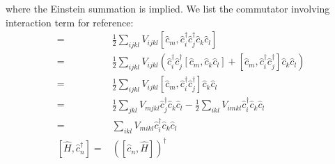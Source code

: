 \documentclass[11pt,letterpaper]{article}
\theoremstyle{definition}
\theoremstyle{plain}
\theoremstyle{remark}
\begin{document}
where the Einstein summation is implied. We list the commutator involving interaction term for reference:
\begin{align}
    [\hat{c}_m, \hat{V}] =& \frac{1}{2} \sum_{ijkl} V_{ijkl} [\hat{c}_m, \hat{c}^\dagger_i \hat{c}^\dagger_j \hat{c}_k \hat{c}_l] \\
    =& \frac{1}{2} \sum_{ijkl} V_{ijkl} \left(\hat{c}^\dagger_i \hat{c}^\dagger_j[\hat{c}_m, \hat{c}_k \hat{c}_l] + [\hat{c}_m, \hat{c}^\dagger_i \hat{c}^\dagger_j] \hat{c}_k \hat{c}_l \right) \\
    =& \frac{1}{2} \sum_{ijkl} V_{ijkl} [\hat{c}_m, \hat{c}^\dagger_i \hat{c}^\dagger_j] \hat{c}_k \hat{c}_l \\
    =& \frac{1}{2} \sum_{jkl} V_{mjkl} \hat{c}^\dagger_j \hat{c}_k \hat{c}_l - \frac{1}{2} \sum_{ikl} V_{imkl} \hat{c}^\dagger_i \hat{c}_k \hat{c}_l \\
    =& \sum_{ikl} V_{mikl} \hat{c}^\dagger_i \hat{c}_k \hat{c}_l
    \\[1.5em]
    [\hat{H}, \hat{c}^\dagger_n] =& \left([\hat{c}_n, \hat{H}]\right)^\dagger
\end{align}
\end{document}
